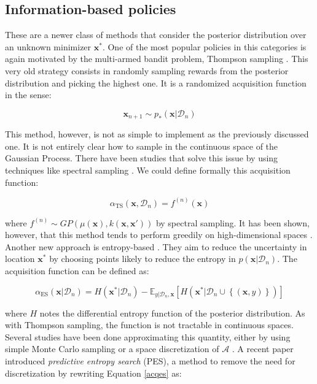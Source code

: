 \documentclass[10pt,a4paper,twoside]{book}
\begin{document}
\subsection{Information-based policies}

These are a newer class of methods that consider the posterior distribution over an unknown minimizer $\boldsymbol{x}^*$. One of the most popular policies in this categories is again motivated by the multi-armed bandit problem, Thompson sampling \cite{Kaufmann2012}. This very old strategy consists in randomly sampling rewards from the posterior distribution and picking the highest one. It is a randomized acquisition function in the sense:

\begin{equation}
\boldsymbol{x}_{n+1} \sim p_{*}(\boldsymbol{x}|\mathcal{D}_n)
\end{equation}

This method, however, is not as simple to implement as the previously discussed one. It is not entirely clear how to sample in the continuous space of the Gaussian Process. There have been studies that solve this issue by using techniques like spectral sampling \cite{Rahimi2007}. We could define formally this acquisition function:

\begin{equation}
\alpha_{\mathrm{TS}}(\boldsymbol{x}, \mathcal{D}_n) = f^{(n)}(\boldsymbol{x})
\end{equation}

where $f^{(n)} \sim GP\left(\mu(\boldsymbol{x}), k(\boldsymbol{x}, \boldsymbol{x'})\right)$ by spectral sampling. It has been shown, however, that this method tends to perform greedily on high-dimensional spaces \cite{Hennig2012}. Another new approach is entropy-based \cite{Villemonteix2009}. They aim to reduce the uncertainty in location $\boldsymbol{x}^{*}$ by choosing points likely to reduce the entropy in $p(\boldsymbol{x}|\mathcal{D}_n)$. The acquisition function can be defined as:

\begin{equation}
\label{acqes}
\alpha_{\mathrm{ES}}(\boldsymbol{x}|\mathcal{D}_n) = H(\boldsymbol{x}^*|\mathcal{D}_n) - \mathbb{E}_{y|\mathcal{D}_n, \boldsymbol{x}}\left[ H(\boldsymbol{x}^*|\mathcal{D}_n \cup \left\lbrace (\boldsymbol{x}, y) \right\rbrace) \right]
\end{equation}

where $H$ notes the differential entropy function of the posterior distribution. As with Thompson sampling, the function is not tractable in continuous spaces. Several studies have been done approximating this quantity, either by using simple Monte Carlo sampling \cite{Villemonteix2009} or a space discretization of $\mathcal{A}$ \cite{Hennig2012}. A recent paper \cite{Hernandez-Lobato2014} introduced \textit{predictive entropy search} (PES), a method to remove the need for discretization by rewriting Equation \ref{acqes} as:
\end{document}
